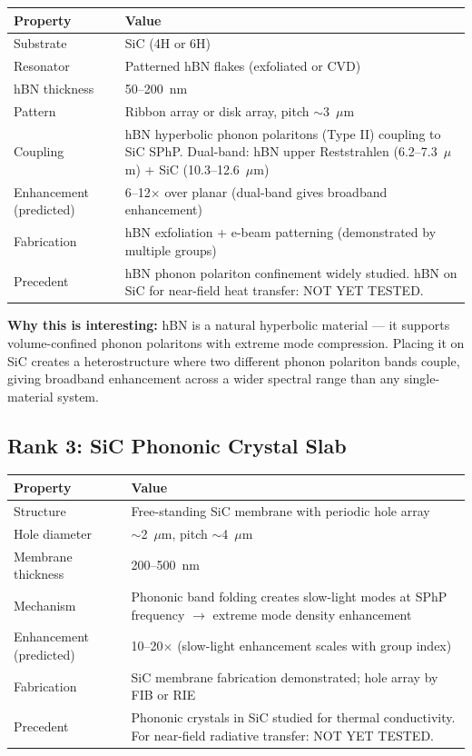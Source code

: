 \documentclass[11pt, a4paper]{article}
\begin{document}
\begin{center}
\begin{tabular}{@{}lp{9cm}@{}}
\toprule
\textbf{Property} & \textbf{Value} \\
\midrule
Substrate & SiC (4H or 6H) \\
Resonator & Patterned hBN flakes (exfoliated or CVD) \\
hBN thickness & 50--200~nm \\
Pattern & Ribbon array or disk array, pitch $\sim$3~$\mu$m \\
Coupling & hBN hyperbolic phonon polaritons (Type II) coupling
  to SiC SPhP. Dual-band: hBN upper Reststrahlen (6.2--7.3~$\mu$m)
  + SiC (10.3--12.6~$\mu$m) \\
Enhancement (predicted) & 6--12$\times$ over planar (dual-band
  gives broadband enhancement) \\
Fabrication & hBN exfoliation + e-beam patterning (demonstrated
  by multiple groups) \\
\midrule
Precedent & hBN phonon polariton confinement widely studied.
  hBN on SiC for near-field heat transfer:
  \textcolor{nm-orange}{NOT YET TESTED.} \\
\bottomrule
\end{tabular}
\end{center}

\textbf{Why this is interesting:} hBN is a natural hyperbolic
material --- it supports volume-confined phonon polaritons with
extreme mode compression. Placing it on SiC creates a
heterostructure where two different phonon polariton bands
couple, giving broadband enhancement across a wider spectral
range than any single-material system.

\subsection{Rank 3: SiC Phononic Crystal Slab}

\begin{center}
\begin{tabular}{@{}lp{9cm}@{}}
\toprule
\textbf{Property} & \textbf{Value} \\
\midrule
Structure & Free-standing SiC membrane with periodic hole
  array \\
Hole diameter & $\sim$2~$\mu$m, pitch $\sim$4~$\mu$m \\
Membrane thickness & 200--500~nm \\
Mechanism & Phononic band folding creates slow-light modes
  at SPhP frequency $\to$ extreme mode density enhancement \\
Enhancement (predicted) & 10--20$\times$ (slow-light
  enhancement scales with group index) \\
Fabrication & SiC membrane fabrication demonstrated; hole
  array by FIB or RIE \\
\midrule
Precedent & Phononic crystals in SiC studied for thermal
  conductivity. For near-field radiative transfer:
  \textcolor{nm-orange}{NOT YET TESTED.} \\
\bottomrule
\end{tabular}
\end{center}
\end{document}
